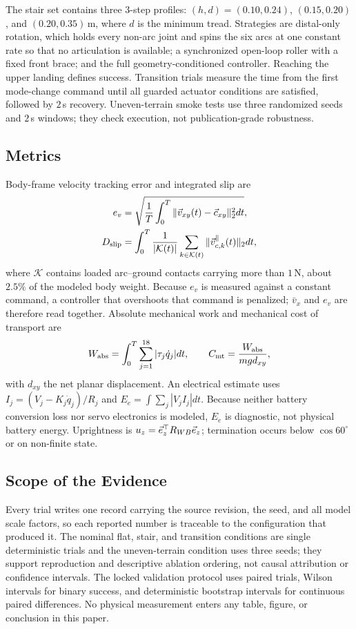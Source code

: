The stair set contains three 3-step profiles: $(h,d)=(0.10,0.24)$,
$(0.15,0.20)$, and $(0.20,0.35)\,$m, where $d$ is the minimum tread. Strategies
are distal-only rotation, which holds every non-arc joint and spins the six arcs
at one constant rate so that no articulation is available; a synchronized
open-loop roller with a fixed front brace; and the full geometry-conditioned
controller. Reaching the upper landing defines success.
Transition trials measure the time from the first mode-change command until all
guarded actuator conditions are satisfied, followed by $2\,$s recovery.
Uneven-terrain smoke tests use three randomized seeds and $2\,$s windows; they
check execution, not publication-grade robustness.

\subsection{Metrics}

Body-frame velocity tracking error and integrated slip are
\begin{align}
 e_v&=\sqrt{\frac1T\int_0^T\|\vec{v}_{xy}(t)-\vec{c}_{xy}\|_2^2dt}, \label{eq:rmse}\\
 D_{\rm slip}&=\int_0^T\frac1{|\mathcal{K}(t)|}
 \sum_{k\in\mathcal{K}(t)}\|\vec{v}_{c,k}^{\parallel}(t)\|_2dt,     \label{eq:slip}
\end{align}
where $\mathcal{K}$ contains loaded arc--ground contacts carrying more than
$1\,$N, about $2.5\%$ of the modeled body weight. Because $e_v$ is measured
against a constant command, a controller that overshoots that command is
penalized; $\bar v_x$ and $e_v$ are therefore read together. Absolute mechanical
work and mechanical cost of transport are
\begin{equation}
 W_{\rm abs}=\int_0^T\sum_{j=1}^{18}|\tau_j\dot q_j|dt,
 \qquad C_{\rm mt}=\frac{W_{\rm abs}}{mgd_{xy}},                \label{eq:cot}
\end{equation}
with $d_{xy}$ the net planar displacement. An electrical estimate uses
$I_j=(V_j-K_j\dot q_j)/R_j$ and $E_e=\int\sum_j|V_jI_j|dt$. Because neither
battery conversion loss nor servo electronics is modeled, $E_e$ is diagnostic,
not physical battery energy. Uprightness is
$u_z=\vec{e}_z^\top R_{WB}\vec{e}_z$; termination occurs below $\cos60^\circ$
or on non-finite state.

\subsection{Scope of the Evidence}

Every trial writes one record carrying the source revision, the seed, and all
model scale factors, so each reported number is traceable to the configuration
that produced it. The nominal flat, stair, and transition conditions are single
deterministic trials and the uneven-terrain condition uses three seeds; they
support reproduction and descriptive ablation ordering, not causal attribution
or confidence intervals. The locked validation protocol uses paired trials,
Wilson intervals for binary success, and deterministic bootstrap intervals for
continuous paired differences. No physical measurement enters any table, figure,
or conclusion in this paper.

